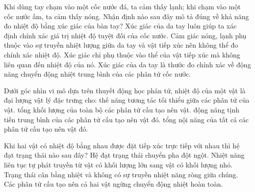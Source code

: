 \begin{ex}
Khi dùng tay chạm vào một cốc nước đá, ta cảm thấy lạnh; khi chạm vào một cốc nước ấm, ta cảm thấy nóng. Nhận định nào sau đây mô tả đúng về khả năng đo nhiệt độ bằng xúc giác của bàn tay?
\choice
{Xúc giác của da tay luôn giúp ta xác định chính xác giá trị nhiệt độ tuyệt đối của cốc nước.}
{\True Cảm giác nóng, lạnh phụ thuộc vào sự truyền nhiệt lượng giữa da tay và vật tiếp xúc nên không thể đo chính xác nhiệt độ.}
{Xúc giác chỉ phụ thuộc vào thể của vật tiếp xúc mà không liên quan đến nhiệt độ của nó.}
{Xúc giác của da tay là thước đo chính xác về động năng chuyển động nhiệt trung bình của các phân tử cốc nước.}
\end{ex}

\begin{ex}
Dưới góc nhìn vi mô dựa trên thuyết động học phân tử, nhiệt độ của một vật là đại lượng vật lý đặc trưng cho:
\choice
{thế năng tương tác tối thiểu giữa các phân tử của vật.}
{tổng khối lượng của toàn bộ các phân tử cấu tạo nên vật.}
{\True động năng tịnh tiến trung bình của các phân tử cấu tạo nên vật đó.}
{tổng nội năng của tất cả các phân tử cấu tạo nên vật đó.}
\end{ex}

\begin{ex}
Khi hai vật có nhiệt độ bằng nhau được đặt tiếp xúc trực tiếp với nhau thì hệ đạt trạng thái nào sau đây?
\choice
{Hệ đạt trạng thái chuyển pha đột ngột.}
{Nhiệt năng liên tục tự phát truyền từ vật có khối lượng lớn sang vật có khối lượng nhỏ.}
{\True Trạng thái cân bằng nhiệt và không có sự truyền nhiệt năng ròng giữa chúng.}
{Các phân tử cấu tạo nên cả hai vật ngừng chuyển động nhiệt hoàn toàn.}
\end{ex}

